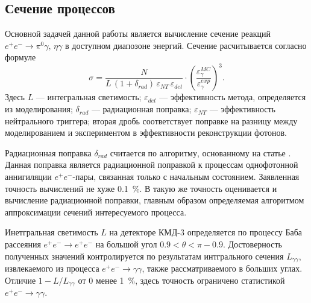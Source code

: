 \subsection{Сечение процессов}

Основной задачей данной работы является вычисление сечение реакций
$e^+e^- \to \pi^0 \gamma, \, \eta \gamma$ в доступном диапозоне энергий.
Сечение расчитывается согласно формуле
\begin{equation}
	\sigma = \frac{ N } { L \, (1+\delta_{rad}) \, \varepsilon_{NT} \,
	\varepsilon_{det}} \cdot  
	\left( \frac{ {\varepsilon^{MC}_{\gamma}} }{ {\varepsilon^{exp}_{\gamma}} } \right)^3.
\end{equation}
Здесь $L$ --- интегральная светимость;
$\varepsilon_{det}$ --- эффективность метода, определяется из моделирования;
$\delta_{rad}$ --- радиационная поправка;
$\varepsilon_{NT}$ --- эффективность нейтрального триггера;
вторая дробь соответствует поправке на разницу между моделированием и экспериментом в эффективности
реконструкции фотонов.

Радиационная поправка $\delta_{rad}$ считается по алгоритму, основанному на статье \cite{Kuraev1985}.
Данная поправка является радиационной поправкой к процессам однофотонной аннигиляции $e^+ e^-$-пары,
связанная только с начальным состоянием.
Заявленная точность вычислений не хуже \SI{0.1}{\percent}.
В такую же точность оценивается и вычисление радиационной поправки,
главным образом определяемая алгоритмом аппроксимации сечений интересуемого процесса.

Инетгральная светимость $L$ на детекторе КМД-3 определяется по процессу Баба рассеяния
$e^+e^- \to e^+e^-$ на большой угол $0.9 < \theta < \pi - 0.9$.
Достоверность полученных значений контролируется по результатам интгрального сечения $L_{\gamma \gamma}$,
извлекаемого из процесса $e^+e^- \to \gamma \gamma$,
также рассматриваемого в больших углах.
Отличие $1 - L / L_{\gamma \gamma}$ от 0 менее \SI{1}{\percent},
здесь точность ограничено статистикой $e^+e^- \to \gamma \gamma$.



